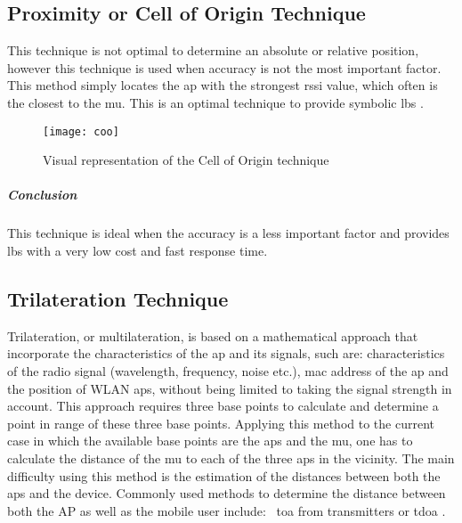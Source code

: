 \subsection{Proximity or Cell of Origin Technique}
This technique is not optimal to determine an absolute or relative position, however this technique is used when accuracy is not the most important factor. This method simply locates the \acrshort{ap} with the strongest \acrshort{rssi} value, which often is the closest to the \acrlong{mu}. This is an optimal technique to provide symbolic \acrlong{lbs} \cite{Sakpere2017}.
\begin{figure}[h!]
\centering
\texttt{[image: coo]}
\caption{Visual representation of the Cell of Origin technique ~\cite[p.12]{S2016}}
\label{fig:coo}
\end{figure}
\subparagraph{Conclusion} This technique is ideal when the accuracy is a less important factor and provides \acrlong{lbs} with a very low cost and fast response time.
\subsection{Trilateration Technique}
Trilateration, or multilateration, is based on a mathematical approach that incorporate the characteristics of the \acrshort{ap} and its signals, such are: characteristics of the radio signal (wavelength, frequency, noise etc.), \acrfull{mac} address of the \acrlong{ap} and the position of WLAN \acrshort{ap}s, without being limited to taking the signal strength in account. This approach requires three base points to calculate and determine a point in range of these three base points. Applying this method to the current case in which the available base points are the \acrshort{ap}s and the \acrshort{mu}, one has to calculate the distance of the \acrlong{mu} to each of the three \acrshort{ap}s in the vicinity. The main difficulty using this method is the estimation of the distances between both the \acrshort{ap}s and the device. Commonly used methods to determine the distance between both the AP as well as the mobile user include: \, \acrfull{toa} from transmitters or \acrfull{tdoa} \cite[p.~1]{Shchekotov} \cite[p.~60]{Mautz}.
